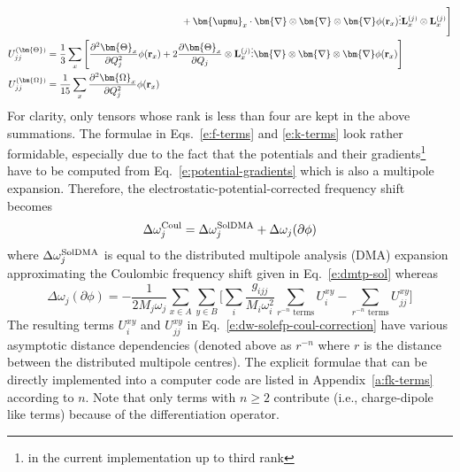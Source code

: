 \documentclass[b5paper,oneside,fleqn,11pt]{book}
\newcommand{\BM}[1]{\bm{#1}}
\newcommand{\fderiv}[2]{\ensuremath{
    \frac{\partial #1}{\partial #2}}}
\newcommand{\sderiv}[2]{\ensuremath{
    \frac{\partial^2 #1}{\partial #2^2}
    }}
\begin{document}
\begin{refsection}
\begin{subequations}
\begin{align}
    &\qquad\qquad\qquad\qquad\qquad\qquad\qquad+ {\BM \upmu}_x 
    \cdot {\BM \nabla}\otimes{\BM \nabla}\otimes{\BM \nabla} \phi({\bf r}_x) \vdots {\bf L}_x^{(j)} \otimes {\bf L}_x^{(j)} \Bigg]      
    \label{e:k-terms-2} \\
%
 U_{jj}^{(\BM\Theta)}  &= \frac{1}{3} \sum_x  
    \left[ \sderiv{{\BM \Theta}_x}{Q_j} \phi({\bf r}_x) 
    + 2 \fderiv{{\BM \Theta}_x}{Q_j} \otimes {\bf L}_x^{(j)} \vdots 
              {\BM \nabla}\otimes{\BM \nabla}\otimes{\BM \nabla} \phi({\bf r}_x)  \right]      
    \label{e:k-terms-3} \\
%
 U_{jj}^{(\BM\Omega)}  &= \frac{1}{15} \sum_x \sderiv{{\BM \Omega}_x}{Q_j} \phi({\bf r}_x)       \label{e:k-terms-4}
\end{align}
\end{subequations}
%
For clarity, only tensors whose rank is less than four are kept in the above summations.
The formulae in Eqs.~\eqref{e:f-terms} and \eqref{e:k-terms} look rather formidable,
especially due to the fact that the potentials and their 
gradients\footnote{in the current implementation up to third rank}
have to be computed from Eq.~\eqref{e:potential-gradients}
which is also a multipole expansion. Therefore,
the electrostatic\hyp{}potential\hyp{}corrected frequency shift
becomes
%
\begin{equation} \label{e:dw-solefp-coul}
\Delta \omega_j^{\rm Coul} = \Delta \omega_j^{\rm SolDMA} + \Delta\omega_j({\partial\phi}) 
\end{equation}
%
where $\Delta \omega_j^{\rm SolDMA}$ is equal to the distributed multipole analysis (DMA)
expansion approximating the Coulombic frequency shift given in Eq.~\eqref{e:dmtp-sol} whereas
%
\begin{equation} \label{e:dw-solefp-coul-correction}
\Delta\omega_j({\partial\phi})  = -\frac{1}{2M_j\omega_j}
\sum_{x \in A}\sum_{y \in B}
\Big[
\sum_i  \frac{g_{ijj}}{M_i\omega_i^2} \sum_{r^{-n} \textrm{ terms} } U_i^{xy} - \sum_{r^{-n} \textrm{ terms} } U_{jj}^{xy}
\Big]
\end{equation}
%
The resulting terms $U_i^{xy}$ and $U_{jj}^{xy}$ in Eq.~\eqref{e:dw-solefp-coul-correction}
have various asymptotic distance dependencies (denoted above as $r^{-n}$
where $r$ is the distance between the distributed multipole centres).
The explicit formulae
that can be directly implemented into a computer code
are listed in Appendix~\ref{a:fk-terms} according to $n$. 
Note that only terms with $n\ge 2$ contribute (i.e., charge-dipole
like terms) because of the differentiation operator.


\end{refsection}
\end{document}
